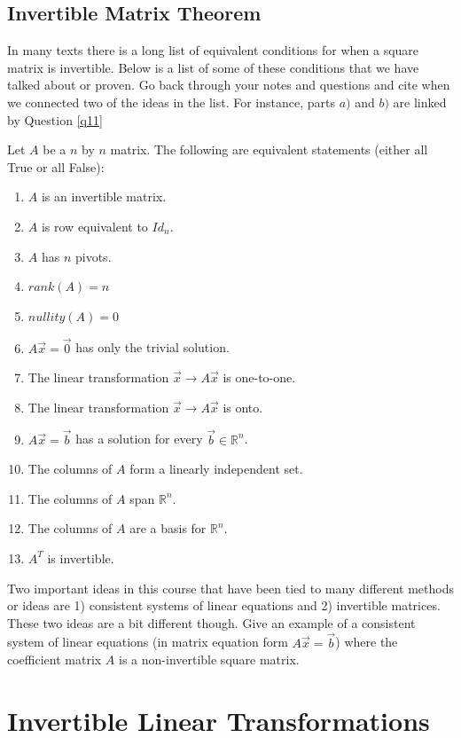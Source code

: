 \subsection{Invertible Matrix Theorem}
\bq In many texts there is a long list of equivalent conditions for when a square matrix is invertible. Below is a list of some of these conditions that we have talked about or proven. Go back through your notes and questions and cite when we connected two of the ideas in the list. For instance, parts $a)$ and $b)$ are linked by Question \ref{q11}
\eq

\begin{theorem}\label{imt}
Let $A$ be a $n$ by $n$ matrix. The following are equivalent statements (either all True or all False):
\begin{enumerate}
\item $A$ is an invertible matrix.
\item $A$ is row equivalent to $Id_n$.
\item $A$ has $n$ pivots.
\item $rank(A)=n$
\item $nullity(A)=0$
\item $A\vec{x} =\vec{0}$ has only the trivial solution.
\item The linear transformation $\vec{x} \rightarrow A\vec{x}$ is one-to-one.
\item The linear transformation $\vec{x} \rightarrow A\vec{x}$ is onto.
\item $A\vec{x}=\vec{b}$ has a solution for every $\vec{b} \in \mathbb{R}^n$.
\item The columns of $A$ form a linearly independent set.
\item The columns of $A$ span $\mathbb{R}^n$.
\item The columns of $A$ are a basis for $\mathbb{R}^n$.
\item $A^T$ is invertible.
\end{enumerate}
\end{theorem}

\bq
Two important ideas in this course that have been tied to many different methods or ideas are 1) consistent systems of linear equations and 2) invertible matrices. These two ideas are a bit different though. Give an example of a consistent system of linear equations (in matrix equation form $A\vec{x} = \vec{b}$) where the coefficient matrix $A$ is a non-invertible square matrix.
\eq

\section{Invertible Linear Transformations}
\begin{annotation}
\end{annotation}

